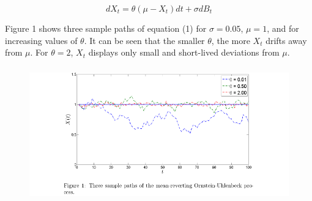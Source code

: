 \documentclass[c, dvipsnames, 8pt]{beamer}
\begin{document}
\begin{frame}[shrink=5]
	
\begin{equation}\label{key}
		dX_t = \theta ( \mu  - X_t)  dt + \sigma  d B_t
\end{equation}


Figure 1 shows three sample paths of equation (1) for $\sigma = 0.05$, $\mu = 1 $,
and for increasing values of $\theta$. It can be seen that the smaller $\theta$, the more
$X_t$ drifts away from $\mu$. For $\theta = 2$, $X_t$ displays only small and short-lived deviations from $\mu$.


	\frametitle{\insertsection} 
\begin{figure}
	\centering
	\includegraphics[width=1\linewidth]{screenshot014}
	\label{fig:screenshot001}
\end{figure}


\end{frame}
\end{document}
